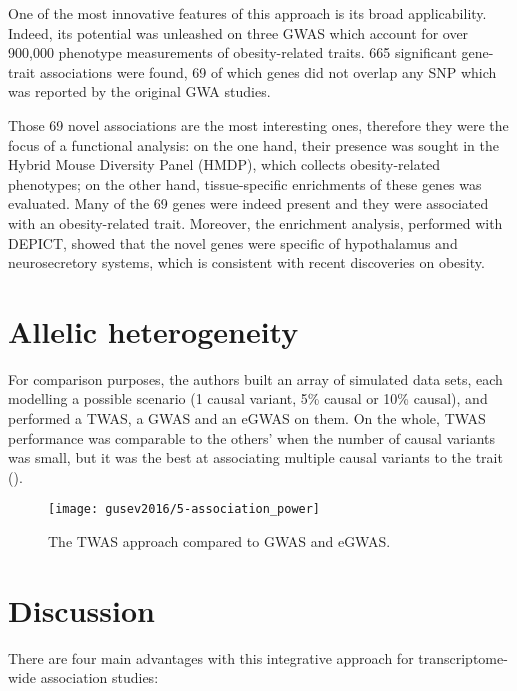 \documentclass[../main.tex]{subfiles}
\begin{document}
One of the most innovative features of this approach is its broad 
applicability. Indeed, its potential was unleashed on three GWAS which 
account for over 900,000 phenotype measurements of obesity-related 
traits. 665 
significant gene-trait associations were found, 69 of which genes did 
not overlap any SNP which was reported by the original GWA studies.

Those 69 novel associations are the most interesting ones, therefore 
they were the focus of a functional analysis: on the one hand, their 
presence was sought in the Hybrid Mouse Diversity Panel (HMDP), which 
collects obesity-related phenotypes; on the other hand, tissue-specific 
enrichments of these genes was evaluated. Many of the 69 genes were 
indeed present and they were associated with an obesity-related trait. 
Moreover, the enrichment analysis, performed with DEPICT, showed that 
the novel genes were specific of hypothalamus and neurosecretory 
systems, which is consistent with recent discoveries on obesity.

\section{Allelic heterogeneity}

For comparison purposes, the authors built an array of simulated data 
sets, each modelling a possible scenario (1 causal variant, 5\% causal 
or 10\% causal), and performed a TWAS, a GWAS and an eGWAS on them. On 
the whole, TWAS performance was comparable to the others' when the 
number of causal variants was small, but it was the best at associating 
multiple causal variants to the trait ().


\begin{figure}
	\texttt{[image: gusev2016/5-association\_power]}
	\caption{The TWAS approach compared to GWAS and eGWAS.}
\end{figure}

\section{Discussion}

There are four main advantages with this integrative approach for 
transcriptome-wide association studies:
\end{document}

